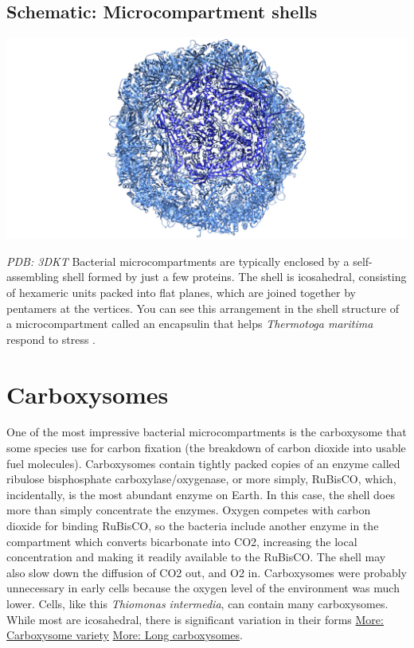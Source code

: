 \documentclass[]{tufte-book}
\begin{document}
\hypertarget{Microcompartment_shells}{\subsection*{Schematic:
Microcompartment shells}\label{Microcompartment_shells}}

\includegraphics{img/schematics/4_6_1}

\emph{PDB: 3DKT} Bacterial microcompartments are typically enclosed by a
self-assembling shell formed by just a few proteins. The shell is
icosahedral, consisting of hexameric units packed into flat planes,
which are joined together by pentamers at the vertices. You can see this
arrangement in the shell structure of a microcompartment called an
encapsulin that helps \emph{Thermotoga maritima} respond to stress
\citep{sutter2008}.

\section{Carboxysomes}\label{carboxysomes}

One of the most impressive bacterial microcompartments is the
carboxysome that some species use for carbon fixation (the breakdown of
carbon dioxide into usable fuel molecules). Carboxysomes contain tightly
packed copies of an enzyme called ribulose bisphosphate
carboxylase/oxygenase, or more simply, RuBisCO, which, incidentally, is
the most abundant enzyme on Earth. In this case, the shell does more
than simply concentrate the enzymes. Oxygen competes with carbon dioxide
for binding RuBisCO, so the bacteria include another enzyme in the
compartment which converts bicarbonate into CO2, increasing the local
concentration and making it readily available to the RuBisCO. The shell
may also slow down the diffusion of CO2 out, and O2 in. Carboxysomes
were probably unnecessary in early cells because the oxygen level of the
environment was much lower. Cells, like this \emph{Thiomonas
intermedia}, can contain many carboxysomes. While most are icosahedral,
there is significant variation in their forms
\protect\hyperlink{Carboxysome_variety}{More: Carboxysome variety}
\protect\hyperlink{Long_carboxysomes}{More: Long carboxysomes}.
\end{document}
